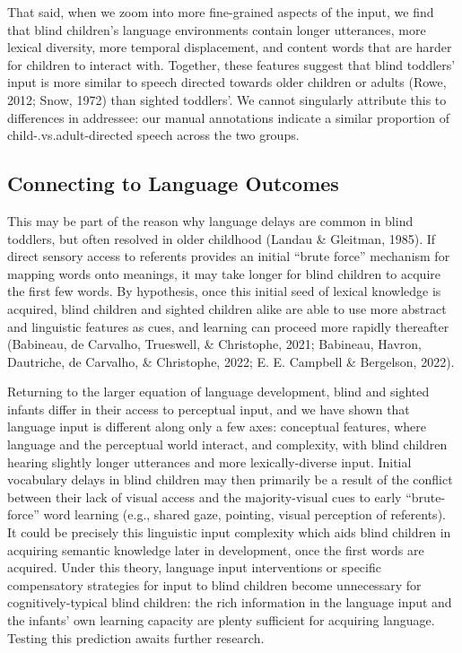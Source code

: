 \documentclass[
  man,floatsintext]{apa6}
\begin{document}
That said, when we zoom into more fine-grained aspects of the input, we find that blind children's language environments contain longer utterances, more lexical diversity, more temporal displacement, and content words that are harder for children to interact with. Together, these features suggest that blind toddlers' input is more similar to speech directed towards older children or adults (Rowe, 2012; Snow, 1972) than sighted toddlers'. We cannot singularly attribute this to differences in addressee: our manual annotations indicate a similar proportion of child-.vs.adult-directed speech across the two groups.

\hypertarget{connecting-to-language-outcomes}{%
\subsection{Connecting to Language Outcomes}\label{connecting-to-language-outcomes}}

This may be part of the reason why language delays are common in blind toddlers, but often resolved in older childhood (Landau \& Gleitman, 1985). If direct sensory access to referents provides an initial ``brute force'' mechanism for mapping words onto meanings, it may take longer for blind children to acquire the first few words. By hypothesis, once this initial seed of lexical knowledge is acquired, blind children and sighted children alike are able to use more abstract and linguistic features as cues, and learning can proceed more rapidly thereafter (Babineau, de Carvalho, Trueswell, \& Christophe, 2021; Babineau, Havron, Dautriche, de Carvalho, \& Christophe, 2022; E. E. Campbell \& Bergelson, 2022).

Returning to the larger equation of language development, blind and sighted infants differ in their access to perceptual input, and we have shown that language input is different along only a few axes: conceptual features, where language and the perceptual world interact, and complexity, with blind children hearing slightly longer utterances and more lexically-diverse input. Initial vocabulary delays in blind children may then primarily be a result of the conflict between their lack of visual access and the majority-visual cues to early ``brute-force'' word learning (e.g., shared gaze, pointing, visual perception of referents). It could be precisely this linguistic input complexity which aids blind children in acquiring semantic knowledge later in development, once the first words are acquired. Under this theory, language input interventions or specific compensatory strategies for input to blind children become unnecessary for cognitively-typical blind children: the rich information in the language input and the infants' own learning capacity are plenty sufficient for acquiring language. Testing this prediction awaits further research.
\end{document}
